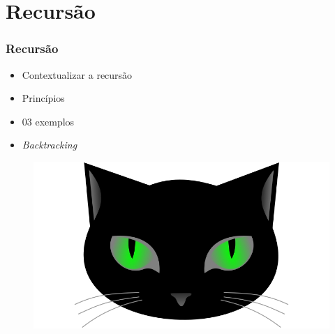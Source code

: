 
\section{Recursão}

\begin{frame}
\frametitle{Recursão}
\begin{minipage}{0.47\textwidth}
    \begin{itemize}
        \item Contextualizar a recursão
        \item Princípios
        \item 03 exemplos
        \item \textit{Backtracking}
    \end{itemize}
\end{minipage}
\begin{minipage}{0.5\textwidth}
\begin{figure}[ht!]
\begin{center}
\includegraphics[width=1.2\textwidth, height=0.40\textheight]{figures/logo_picat_alex.jpg}
\end{center}
\end{figure}
\end{minipage}
\end{frame}



